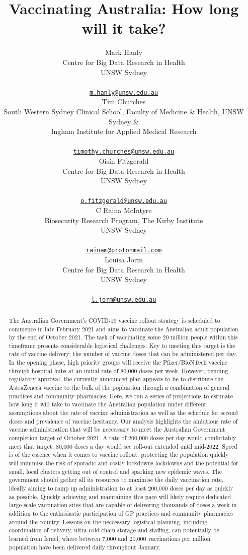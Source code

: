 \documentclass{article}
\title{Vaccinating Australia: How long will it take?}
\author{
    Mark Hanly
   \\
    Centre for Big Data Research in Health \\
    UNSW Sydney \\
   \\
  \texttt{\href{mailto:m.hanly@unsw.edu.au}{\nolinkurl{m.hanly@unsw.edu.au}}} \\
   \And
    Tim Churches
   \\
    South Western Sydney Clinical School, Faculty of Medicine \& Health,
UNSW Sydney \& \\
    Ingham Institute for Applied Medical Research \\
   \\
  \texttt{\href{mailto:timothy.churches@unsw.edu.au}{\nolinkurl{timothy.churches@unsw.edu.au}}} \\
   \And
    Oisín Fitzgerald
   \\
    Centre for Big Data Research in Health \\
    UNSW Sydney \\
   \\
  \texttt{\href{mailto:o.fitzgerald@unsw.edu.au}{\nolinkurl{o.fitzgerald@unsw.edu.au}}} \\
   \And
    C Raina McIntyre
   \\
    Biosecurity Research Program, The Kirby Institute \\
    UNSW Sydney \\
   \\
  \texttt{\href{mailto:rainam@protonmail.com}{\nolinkurl{rainam@protonmail.com}}} \\
   \And
    Louisa Jorm
   \\
    Centre for Big Data Research in Health \\
    UNSW Sydney \\
   \\
  \texttt{\href{mailto:l.jorm@unsw.edu.au}{\nolinkurl{l.jorm@unsw.edu.au}}} \\
  }
\begin{document}
\maketitle

\def\tightlist{}


\begin{abstract}
The Australian Government's COVID-19 vaccine rollout strategy is
scheduled to commence in late February 2021 and aims to vaccinate the
Australian adult population by the end of October 2021. The task of
vaccinating some 20 million people within this timeframe presents
considerable logistical challenges. Key to meeting this target is the
rate of vaccine delivery: the number of vaccine doses that can be
administered per day. In the opening phase, high priority groups will
receive the Pfizer/BioNTech vaccine through hospital hubs at an initial
rate of 80,000 doses per week. However, pending regulatory approval, the
currently announced plan appears to be to distribute the AstraZeneca
vaccine to the bulk of the popluation through a combination of general
practices and community pharmacies. Here, we run a series of projections
to estimate how long it will take to vaccinate the Australian population
under different assumptions about the rate of vaccine administration as
well as the schedule for second doses and prevalence of vaccine
hesitancy. Our analysis highlights the ambitious rate of vaccine
administration that will be neccessary to meet the Australian Government
completion target of October 2021. A rate of 200,000 doses per day would
comfortably meet that target; 80,000 doses a day would see roll-out
extended until mid-2022. Speed is of the essence when it comes to
vaccine rollout: protecting the population quickly will minimise the
risk of sporadic and costly lockdowns lockdowns and the potential for
small, local clusters getting out of control and sparking new epidemic
waves. The government should gather all its resources to maximise the
daily vaccination rate, ideally aiming to ramp up administration to at
least 200,000 doses per day as quickly as possible. Quickly achieving
and maintaining this pace will likely require dedicated large-scale
vaccination sites that are capable of delivering thousands of doses a
week in addition to the enthusiastic participation of GP practices and
community pharmacies around the country. Lessons on the neccessary
logistical planning, including coordination of delivery,
ultra-cold-chain storage and staffing, can potentially be learned from
Israel, where between 7,000 and 20,000 vaccinations per million
population have been delivered daily throughout January.
\end{abstract}
\end{document}
